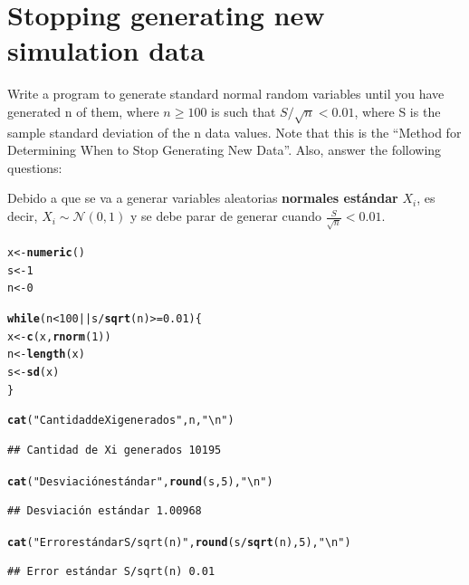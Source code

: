 \documentclass[12pt]{article}\usepackage[]{graphicx}\usepackage[]{xcolor}
\makeatletter
\newcommand{\hlnum}[1]{\textcolor[rgb]{0.686,0.059,0.569}{#1}}%
\newcommand{\hlsng}[1]{\textcolor[rgb]{0.192,0.494,0.8}{#1}}%
\newcommand{\hlopt}[1]{\textcolor[rgb]{0,0,0}{#1}}%
\newcommand{\hldef}[1]{\textcolor[rgb]{0.345,0.345,0.345}{#1}}%
\newcommand{\hlkwa}[1]{\textcolor[rgb]{0.161,0.373,0.58}{\textbf{#1}}}%
\newcommand{\hlkwb}[1]{\textcolor[rgb]{0.69,0.353,0.396}{#1}}%
\newcommand{\hlkwd}[1]{\textcolor[rgb]{0.737,0.353,0.396}{\textbf{#1}}}%
\newenvironment{kframe}{%
 \def\at@end@of@kframe{}%
 \ifinner\ifhmode%
  \def\at@end@of@kframe{\end{minipage}}%
  \begin{minipage}{\columnwidth}%
 \fi\fi%
 \def\FrameCommand##1{\hskip\@totalleftmargin \hskip-\fboxsep
 \colorbox{shadecolor}{##1}\hskip-\fboxsep
     \hskip-\linewidth \hskip-\@totalleftmargin \hskip\columnwidth}%
 \MakeFramed {\advance\hsize-\width
   \@totalleftmargin\z@ \linewidth\hsize
   \@setminipage}}%
 {\par\unskip\endMakeFramed%
 \at@end@of@kframe}
\newenvironment{knitrout}{}{} %
\makeatother
\begin{document}
\section{Stopping generating new simulation data}

Write a program to generate standard normal random variables until you have generated n of them, where $n \geq 100$ is such that $S/\sqrt{n} < 0.01$, where S is the sample standard deviation of the n data values. Note that this is the ``Method for Determining When to Stop Generating New Data''. Also, answer the following questions:



Debido a que se va a generar variables aleatorias \textbf{normales estándar} $X_{i}$, es decir, $X_{i} \sim \mathcal{N}(0, 1)$ y se debe parar de generar cuando $\frac{S}{\sqrt{n}} < 0.01$.

\begin{knitrout}
\color{fgcolor}\begin{kframe}
\begin{alltt}
\hldef{x} \hlkwb{<-} \hlkwd{numeric}\hldef{()}
\hldef{s} \hlkwb{<-} \hlnum{1}
\hldef{n} \hlkwb{<-} \hlnum{0}

\hlkwa{while}\hldef{(n} \hlopt{<} \hlnum{100} \hlopt{||} \hldef{s} \hlopt{/} \hlkwd{sqrt}\hldef{(n)} \hlopt{>=} \hlnum{0.01}\hldef{) \{}
  \hldef{x} \hlkwb{<-} \hlkwd{c}\hldef{(x,} \hlkwd{rnorm}\hldef{(}\hlnum{1}\hldef{))}
  \hldef{n} \hlkwb{<-} \hlkwd{length}\hldef{(x)}
  \hldef{s} \hlkwb{<-} \hlkwd{sd}\hldef{(x)}
\hldef{\}}

\hlkwd{cat}\hldef{(}\hlsng{"Cantidad de Xi generados"}\hldef{, n,} \hlsng{"\textbackslash{}n"}\hldef{)}
\end{alltt}
\begin{verbatim}
## Cantidad de Xi generados 10195
\end{verbatim}
\begin{alltt}
\hlkwd{cat}\hldef{(}\hlsng{"Desviación estándar"}\hldef{,} \hlkwd{round}\hldef{(s,} \hlnum{5}\hldef{),} \hlsng{"\textbackslash{}n"}\hldef{)}
\end{alltt}
\begin{verbatim}
## Desviación estándar 1.00968
\end{verbatim}
\begin{alltt}
\hlkwd{cat}\hldef{(}\hlsng{"Error estándar S/sqrt(n)"}\hldef{,} \hlkwd{round}\hldef{(s}\hlopt{/}\hlkwd{sqrt}\hldef{(n),} \hlnum{5}\hldef{),} \hlsng{"\textbackslash{}n"}\hldef{)}
\end{alltt}
\begin{verbatim}
## Error estándar S/sqrt(n) 0.01
\end{verbatim}
\end{kframe}
\end{knitrout}
\end{document}
